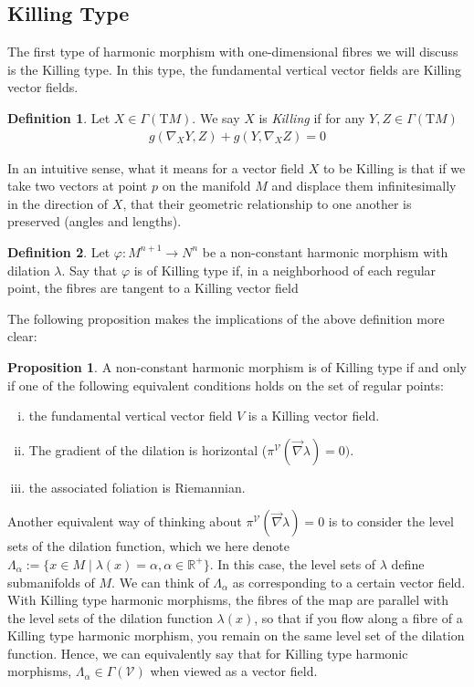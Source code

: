 \documentclass[12pt]{article}
\theoremstyle{definition}
\newtheorem{definition}{Definition}[section]
\newtheorem{proposition}{Proposition}[subsection]
\numberwithin{equation}{subsection}
\begin{document}
\subsection{Killing Type}

The first type  of harmonic morphism with one-dimensional fibres we will discuss is the Killing type. In this type, the fundamental vertical vector fields are Killing vector fields.

\begin{definition}
Let $X \in \Gamma(\text{T}M)$. We say $X$ is \textit{Killing} if for any $Y, Z \in \Gamma(\text{T}M)$
\begin{align}
    g(\nabla_X Y, Z) + g(Y, \nabla_X Z) = 0
\end{align}
\end{definition}

In an intuitive sense, what it means for a vector field $X$ to be Killing is that if we take two vectors at point $p$ on the manifold $M$ and displace them infinitesimally in the direction of $X$, that their geometric relationship to one another is preserved (angles and lengths). 


\begin{definition}
Let $\varphi: M^{n+1} \rightarrow N^n$ be a non-constant harmonic morphism with dilation $\lambda$. Say that $\varphi$ is of Killing type if, in a neighborhood of each regular point, the fibres are tangent to a Killing vector field
\end{definition}

The following proposition makes the implications of the above definition more clear:

\begin{proposition}
A non-constant harmonic morphism is of Killing type if and only if one of the following equivalent conditions holds on the set of regular points:
\begin{enumerate}[(i)]
    \item the fundamental vertical vector field $V$ is a Killing vector field.
    \item The gradient of the dilation is horizontal ($\pi^\mathcal{V}(\vec{\nabla} \lambda) = 0).$
    \item the associated foliation is Riemannian.
\end{enumerate}
\end{proposition}

Another equivalent way of thinking about $\pi^\mathcal{V}(\vec{\nabla} \lambda) = 0$ is to consider the level sets of the dilation function, which we  here denote $\Lambda_\alpha := \{ x \in M \mid \lambda(x) = \alpha, \alpha \in \mathbb{R}^+\} $. In this case, the level sets of $\lambda$ define submanifolds of $M$. We can think of $\Lambda_\alpha$ as corresponding to a certain vector field. With Killing type harmonic morphisms, the fibres of the map are parallel with the level sets of the dilation function $\lambda(x)$, so that if you flow along a fibre of a Killing type harmonic morphism, you remain on the same level set of the dilation function. Hence, we can equivalently say that for Killing type harmonic morphisms, $\Lambda_\alpha \in \Gamma(\mathcal{V})$ when viewed as a vector field.  
\end{document}
